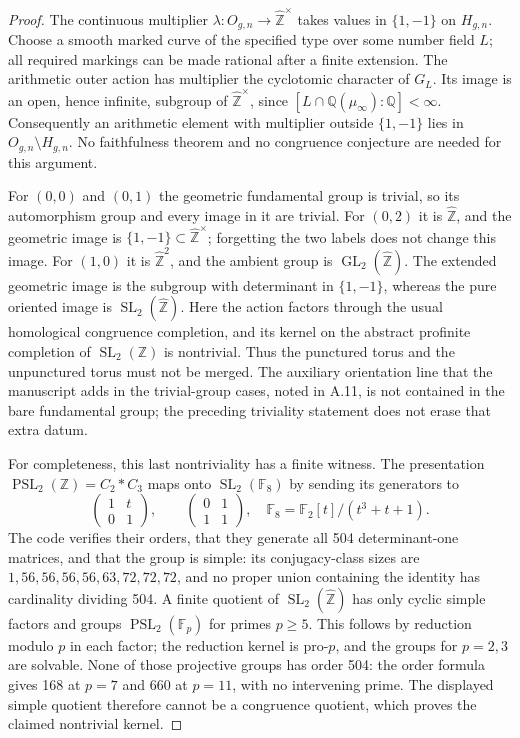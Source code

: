 \begin{proof}
The continuous multiplier
$\lambda:O_{g,n}\to\widehat{\mathbb Z}^{\times}$ takes values in
$\{1,-1\}$ on $H_{g,n}$.  Choose a smooth marked curve of the
specified type over some number field $L$; all required markings can
be made rational after a finite extension.  The arithmetic outer
action has multiplier the cyclotomic character of $G_L$.  Its image
is an open, hence infinite, subgroup of
$\widehat{\mathbb Z}^{\times}$, since
$[L\cap\mathbb Q(\mu_\infty):\mathbb Q]<\infty$.  Consequently an
arithmetic element with multiplier outside $\{1,-1\}$ lies in
$O_{g,n}\setminus H_{g,n}$.  No faithfulness theorem and no congruence
conjecture are needed for this argument.

For $(0,0)$ and $(0,1)$ the geometric fundamental group is trivial,
so its automorphism group and every image in it are trivial.  For
$(0,2)$ it is $\widehat{\mathbb Z}$, and the geometric image is
$\{1,-1\}\subset\widehat{\mathbb Z}^{\times}$; forgetting the two
labels does not change this image.  For $(1,0)$ it is
$\widehat{\mathbb Z}^2$, and the ambient group is
$\operatorname{GL}_2(\widehat{\mathbb Z})$.  The extended geometric
image is the subgroup with determinant in $\{1,-1\}$, whereas the
pure oriented image is $\operatorname{SL}_2(\widehat{\mathbb Z})$.
Here the action factors through the usual homological congruence
completion, and its kernel on the abstract profinite completion of
$\operatorname{SL}_2(\mathbb Z)$ is nontrivial.  Thus the punctured
torus and the unpunctured torus must not be merged.
The auxiliary orientation line that the manuscript adds in the
trivial-group cases, noted in A.11, is not contained in the bare
fundamental group; the preceding triviality statement does not
erase that extra datum.

For completeness, this last nontriviality has a finite witness.
The presentation $\operatorname{PSL}_2(\mathbb Z)=C_2*C_3$
maps onto $\operatorname{SL}_2(\mathbb F_8)$ by sending its
generators to
\[
 \begin{pmatrix}1&t\\0&1\end{pmatrix},\qquad
 \begin{pmatrix}0&1\\1&1\end{pmatrix},
 \quad\mathbb F_8=\mathbb F_2[t]/(t^3+t+1).
\]
The code verifies their orders, that they generate all 504
determinant-one matrices, and that the group is simple: its
conjugacy-class sizes are $1,56,56,56,56,63,72,72,72$, and no
proper union containing the identity has cardinality dividing
504.  A finite quotient of
$\operatorname{SL}_2(\widehat{\mathbb Z})$ has only cyclic
simple factors and groups $\operatorname{PSL}_2(\mathbb F_p)$
for primes $p\geq5$.  This follows by reduction modulo $p$
in each factor; the reduction kernel is pro-$p$, and the
groups for $p=2,3$ are solvable.  None of those projective
groups has order 504: the order formula gives 168 at $p=7$
and 660 at $p=11$, with no intervening prime.  The displayed
simple quotient therefore cannot be a congruence quotient,
which proves the claimed nontrivial kernel.
\end{proof}

